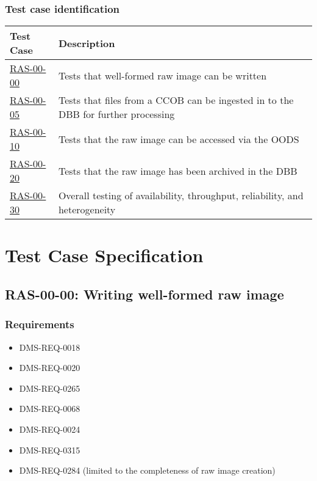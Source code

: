 \documentclass[DM,lsstdraft,STS,toc]{lsstdoc}
\begin{document}
\subsubsection{Test case identification}


\begin{longtable} {|p{}|p{}|}\hline
\textbf{Test Case} & \textbf{Description} \\\hline
\hyperref[ras-00-00]{RAS-00-00} & Tests that well-formed raw image can be written \\\hline
\hyperref[ras-00-05]{RAS-00-05} & Tests that files from a CCOB can be ingested in to the DBB for further processing \\\hline
\hyperref[ras-00-10]{RAS-00-10} & Tests that the raw image can be accessed via the OODS \\\hline
\hyperref[ras-00-20]{RAS-00-20} & Tests that the raw image has been archived in the DBB \\\hline
\hyperref[ras-00-30]{RAS-00-30} & Overall testing of availability, throughput, reliability, and heterogeneity \\\hline
\end{longtable}


\section{Test Case Specification}


\subsection{RAS-00-00: Writing well-formed raw image}
\label{ras-00-00}


\subsubsection{Requirements}

\begin{itemize}
\item{DMS-REQ-0018}
\item{DMS-REQ-0020}
\item{DMS-REQ-0265}
\item{DMS-REQ-0068}
\item{DMS-REQ-0024}
\item{DMS-REQ-0315}
\item{DMS-REQ-0284 (limited to the completeness of raw image creation)}
\end{itemize}
\end{document}
